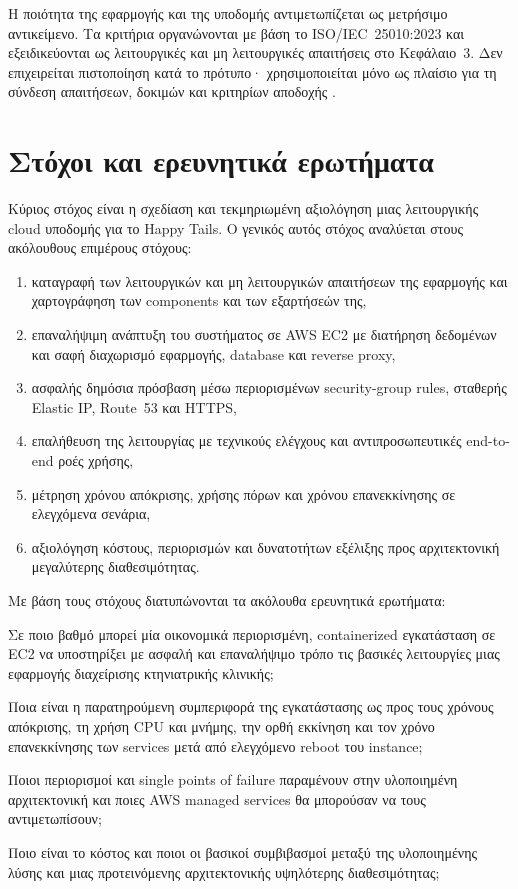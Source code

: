 Η ποιότητα της εφαρμογής και της υποδομής αντιμετωπίζεται ως μετρήσιμο
αντικείμενο. Τα κριτήρια οργανώνονται με βάση το ISO/IEC~25010:2023 και
εξειδικεύονται ως λειτουργικές και μη λειτουργικές απαιτήσεις στο
Κεφάλαιο~3. Δεν επιχειρείται πιστοποίηση κατά το πρότυπο· χρησιμοποιείται
μόνο ως πλαίσιο για τη σύνδεση απαιτήσεων, δοκιμών και κριτηρίων αποδοχής
\cite{iso25010-2023}.

\section{Στόχοι και ερευνητικά ερωτήματα}
Κύριος στόχος είναι η σχεδίαση και τεκμηριωμένη αξιολόγηση μιας λειτουργικής
cloud υποδομής για το Happy Tails. Ο γενικός αυτός στόχος αναλύεται στους
ακόλουθους επιμέρους στόχους:

\begin{enumerate}[label=\arabic*.]
  \item καταγραφή των λειτουργικών και μη λειτουργικών απαιτήσεων της
        εφαρμογής και χαρτογράφηση των components και των εξαρτήσεών της,
  \item επαναλήψιμη ανάπτυξη του συστήματος σε AWS EC2 με διατήρηση δεδομένων
        και σαφή διαχωρισμό εφαρμογής, database και reverse proxy,
  \item ασφαλής δημόσια πρόσβαση μέσω περιορισμένων security-group rules,
        σταθερής Elastic IP, Route~53 και HTTPS,
  \item επαλήθευση της λειτουργίας με τεχνικούς ελέγχους και
        αντιπροσωπευτικές end-to-end ροές χρήσης,
  \item μέτρηση χρόνου απόκρισης, χρήσης πόρων και χρόνου επανεκκίνησης σε
        ελεγχόμενα σενάρια,
  \item αξιολόγηση κόστους, περιορισμών και δυνατοτήτων εξέλιξης προς
        αρχιτεκτονική μεγαλύτερης διαθεσιμότητας.
\end{enumerate}

Με βάση τους στόχους διατυπώνονται τα ακόλουθα ερευνητικά ερωτήματα:

\begin{description}[style=nextline,leftmargin=1.6cm,labelwidth=1.2cm]
  \item[ΕΕ1:] Σε ποιο βαθμό μπορεί μία οικονομικά περιορισμένη, containerized
  εγκατάσταση σε EC2 να υποστηρίξει με ασφαλή και επαναλήψιμο τρόπο τις
  βασικές λειτουργίες μιας εφαρμογής διαχείρισης κτηνιατρικής κλινικής;

  \item[ΕΕ2:] Ποια είναι η παρατηρούμενη συμπεριφορά της εγκατάστασης ως προς
  τους χρόνους απόκρισης, τη χρήση CPU και μνήμης, την ορθή εκκίνηση και τον
  χρόνο επανεκκίνησης των services μετά από ελεγχόμενο reboot του instance;

  \item[ΕΕ3:] Ποιοι περιορισμοί και single points of failure παραμένουν στην
  υλοποιημένη αρχιτεκτονική και ποιες AWS managed services θα μπορούσαν να
  τους αντιμετωπίσουν;

  \item[ΕΕ4:] Ποιο είναι το κόστος και ποιοι οι βασικοί συμβιβασμοί μεταξύ
  της υλοποιημένης λύσης και μιας προτεινόμενης αρχιτεκτονικής υψηλότερης
  διαθεσιμότητας;
\end{description}

